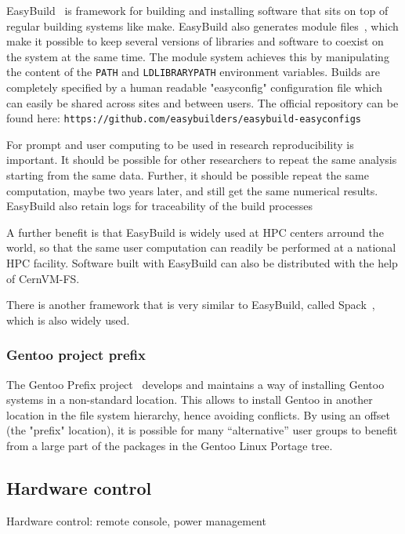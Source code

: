 \documentclass[12pt,a4paper]{article}
\begin{document}
EasyBuild~\cite{easybuild} is framework for building and installing software that sits on top of regular building systems like make. 
EasyBuild also generates module files~\cite{lmod}, which make it possible to keep several versions of libraries and software to coexist on the system at the same time. 
The module system achieves this by manipulating the content of the \texttt{PATH} and {\tt LDLIBRARYPATH} environment variables. 
Builds are completely specified by a human readable "easyconfig" configuration file which can easily be shared across sites and between users. 
The official repository can be found here: \texttt{https://github.com/easybuilders/easybuild-easyconfigs}

For prompt and user computing to be used in research reproducibility is important. It should be possible for other researchers to repeat the same analysis starting from the same data. Further, it should be possible repeat the same computation, maybe two years later, and still get the same numerical results.
EasyBuild also retain logs for traceability of the build processes

A further benefit is that EasyBuild is widely used at HPC centers arround the world, so that the same user computation can readily be performed at a national HPC facility. 
Software built with EasyBuild can also be distributed with the help of CernVM-FS.

There is another framework that is very similar to EasyBuild, called Spack~\cite{spack}, which is also widely used.

\subsubsection{Gentoo project prefix} \label{ssec:gentoo}

The Gentoo Prefix project~\cite{gentoo-prefix} develops and maintains a way of installing Gentoo systems in a non-standard location.
This allows to install Gentoo in another location in the file system hierarchy, hence avoiding conflicts.
By using an offset (the "prefix" location), it is possible for many ``alternative'' user groups to benefit from a large part of the packages in the Gentoo Linux Portage tree. 

\subsection{Hardware control} \label{ssec:hardware}
Hardware control: remote console, power management 
\end{document}
